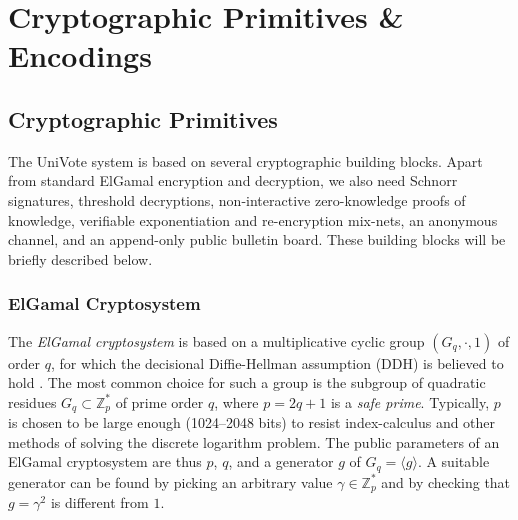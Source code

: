 \documentclass[bibtotoc,halfparskip,oneside]{scrreprt}
\begin{document}
\chapter{Cryptographic Primitives \& Encodings}

\section{Cryptographic Primitives}

The UniVote system is based on several cryptographic building blocks. Apart from standard ElGamal encryption and decryption, we also need Schnorr signatures, threshold decryptions, non-interactive zero-knowledge proofs of knowledge, verifiable exponentiation and re-encryption mix-nets, an anonymous channel, and an append-only public bulletin board. These building blocks will be briefly described below.

\subsection{ElGamal Cryptosystem} 

The \emph{ElGamal cryptosystem} is based on a multiplicative cyclic group $(G_q,\cdot,1)$ of order $q$, for which the decisional Diffie-Hellman assumption (DDH) is believed to hold \cite{gamal84}. The most common choice for such a group is the subgroup of quadratic residues $G_q\subset\mathbb{Z}_p^*$ of prime order $q$, where $p=2q+1$ is a \emph{safe prime}. Typically, $p$ is chosen to be large enough (1024--2048 bits) to resist index-calculus and other methods of solving the discrete logarithm problem. The public parameters of an ElGamal cryptosystem are thus $p$, $q$, and a generator $g$ of $G_q=\langle g\rangle$. A suitable generator can be found by picking an arbitrary value $\gamma\in\mathbb{Z}_p^*$ and by checking that $g=\gamma^2$ is different from $1$.
\end{document}
